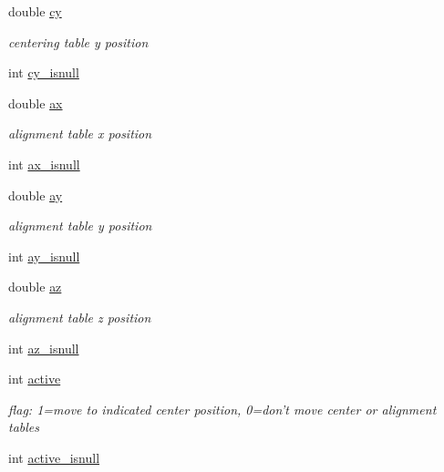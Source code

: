 \begin{DoxyCompactItemize}
\item 
double \hyperlink{structlspg__nextshot__struct_ab7a7b37a17f06c4e9ebdcdf056946098}{cy}
\begin{DoxyCompactList}\small\item\em centering table y position \item\end{DoxyCompactList}\item 
int \hyperlink{structlspg__nextshot__struct_a3895d645420848aed05b95694ec8c6c7}{cy\_\-isnull}
\item 
double \hyperlink{structlspg__nextshot__struct_a7f57874223897ab7d9c7531a9522904d}{ax}
\begin{DoxyCompactList}\small\item\em alignment table x position \item\end{DoxyCompactList}\item 
int \hyperlink{structlspg__nextshot__struct_aae46c7911b2b218497ad4a68f3dbb7d9}{ax\_\-isnull}
\item 
double \hyperlink{structlspg__nextshot__struct_a9e20b9a0aeb41f7f7d653a1c60335bf1}{ay}
\begin{DoxyCompactList}\small\item\em alignment table y position \item\end{DoxyCompactList}\item 
int \hyperlink{structlspg__nextshot__struct_a9da91abc8090532ed98ccd47a3bab775}{ay\_\-isnull}
\item 
double \hyperlink{structlspg__nextshot__struct_a66e678866ce79f6398b66d033ae45a17}{az}
\begin{DoxyCompactList}\small\item\em alignment table z position \item\end{DoxyCompactList}\item 
int \hyperlink{structlspg__nextshot__struct_aaebd6d432810313294b5fed5f4445cb1}{az\_\-isnull}
\item 
int \hyperlink{structlspg__nextshot__struct_a1a94eefbad713976a3d9213695a6ca28}{active}
\begin{DoxyCompactList}\small\item\em flag: 1=move to indicated center position, 0=don't move center or alignment tables \item\end{DoxyCompactList}\item 
int \hyperlink{structlspg__nextshot__struct_a9f777671ec617a0f533b3c51f28babb3}{active\_\-isnull}

\end{DoxyCompactItemize}
